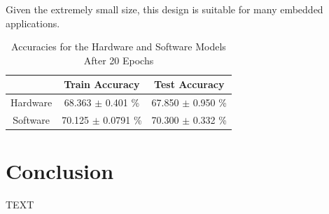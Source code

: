 \documentclass[10pt,journal]{IEEEtran}
\begin{document}
		Given the extremely small size, this design is suitable for many embedded applications.
		
		\begin{table}[!t]
			\renewcommand{\arraystretch}{1.3}
			\caption{Accuracies for the Hardware and Software Models After 20 Epochs}
			\label{table:accuracy_results}
			\centering
			\begin{tabular}{ccc}
				\hline
				         & Train Accuracy           & Test Accuracy           \\
				\hline
				Hardware & 68.363 \(\pm\) 0.401  \% & 67.850 \(\pm\) 0.950 \% \\
				Software & 70.125 \(\pm\) 0.0791 \% & 70.300 \(\pm\) 0.332 \% \\
				\hline
			\end{tabular}
		\end{table}		
	
	\section{Conclusion}
		TEXT
	
	
		
	
\end{document}

